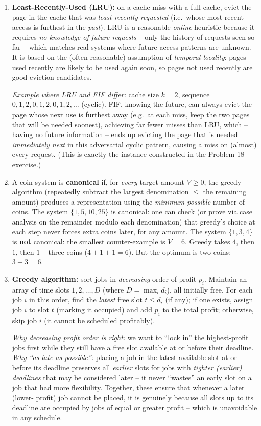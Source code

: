 \documentclass[11pt]{article}
\begin{document}
\begin{enumerate}[label=\textbf{A\arabic*.}, leftmargin=2.2em]
\item \textbf{Least-Recently-Used (LRU):} on a cache miss with a full cache, evict the
page in the cache that was \emph{least recently requested} (i.e.\ whose most recent access
is furthest in the \emph{past}). LRU is a reasonable \emph{online} heuristic because it
requires \emph{no knowledge of future requests} -- only the history of requests seen so
far -- which matches real systems where future access patterns are unknown. It is based on
the (often reasonable) assumption of \emph{temporal locality}: pages used recently are
likely to be used again soon, so pages not used recently are good eviction candidates.

\textit{Example where LRU and FIF differ:} cache size $k=2$, sequence
$0,1,2,0,1,2,0,1,2,\ldots$ (cyclic). FIF, knowing the future, can always evict the page
whose next use is furthest away (e.g.\ at each miss, keep the two pages that will be
needed soonest), achieving far fewer misses than LRU, which -- having no future
information -- ends up evicting the page that is needed \emph{immediately next} in this
adversarial cyclic pattern, causing a miss on (almost) every request. (This is exactly the
instance constructed in the Problem 18 exercise.)

\item A coin system is \textbf{canonical} if, for \emph{every} target amount $V \ge 0$,
the greedy algorithm (repeatedly subtract the largest denomination $\le$ the remaining
amount) produces a representation using the \emph{minimum possible} number of coins. The
system $\{1,5,10,25\}$ is canonical: one can check (or prove via case analysis on the
remainder modulo each denomination) that greedy's choice at each step never forces extra
coins later, for any amount. The system $\{1,3,4\}$ is \textbf{not} canonical: the
smallest counter-example is $V=6$. Greedy takes $4$, then $1$, then $1$ -- three coins
($4+1+1=6$). But the optimum is two coins: $3+3=6$.

\item \textbf{Greedy algorithm:} sort jobs in \emph{decreasing} order of profit $p_i$.
Maintain an array of time slots $1, 2, \ldots, D$ (where $D = \max_i d_i$), all initially
free. For each job $i$ in this order, find the \emph{latest} free slot $t \le d_i$ (if
any); if one exists, assign job $i$ to slot $t$ (marking it occupied) and add $p_i$ to the
total profit; otherwise, skip job $i$ (it cannot be scheduled profitably).

\textit{Why decreasing profit order is right:} we want to ``lock in'' the highest-profit
jobs first while they still have a free slot available at or before their deadline.
\textit{Why ``as late as possible'':} placing a job in the latest available slot at or
before its deadline preserves all \emph{earlier} slots for jobs with \emph{tighter
(earlier) deadlines} that may be considered later -- it never ``wastes'' an early slot on
a job that had more flexibility. Together, these ensure that whenever a later (lower-
profit) job cannot be placed, it is genuinely because all slots up to its deadline are
occupied by jobs of equal or greater profit -- which is unavoidable in any schedule.


\end{enumerate}
\end{document}
